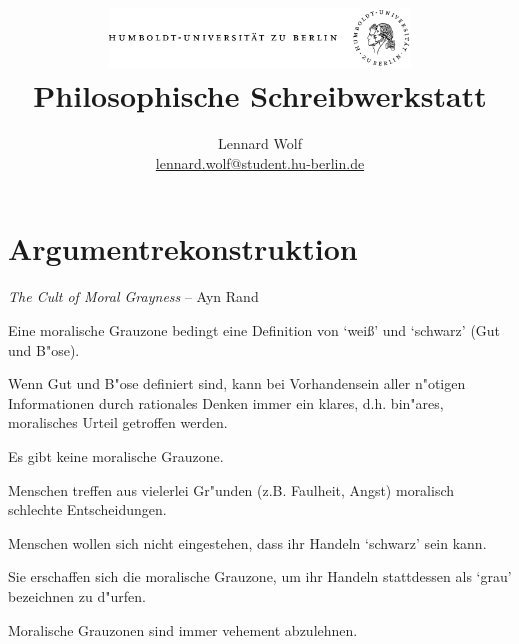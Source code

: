 \documentclass[a4paper]{article}
\begin{document}
\title{
	\includegraphics*[width=0.6\textwidth]{images/hu_logo.png}\\
	\vspace{18pt}
	Philosophische Schreibwerkstatt}
\author{Lennard Wolf\\
        \href{mailto:lennard.wolf@student.hu-berlin.de}{lennard.wolf@student.hu-berlin.de}}
\maketitle


\section*{Argumentrekonstruktion}
\large

\emph{The Cult of Moral Grayness} -- Ayn Rand

\begin{description}[leftmargin=!,labelwidth=\widthof{\bfseries P2}]
  \item[P1] Eine moralische Grauzone bedingt eine Definition von `wei\ss' und `schwarz' (Gut und B"ose).
  \item[P2] Wenn Gut und B"ose definiert sind, kann bei Vorhandensein aller n"otigen Informationen durch rationales Denken immer ein klares, d.h. bin"ares, moralisches Urteil getroffen werden. 
  \item[K1] Es gibt keine moralische Grauzone.
  \item[P3] Menschen treffen aus vielerlei Gr"unden (z.B. Faulheit, Angst) moralisch schlechte Entscheidungen. 
  \item[P4] Menschen wollen sich nicht eingestehen, dass ihr Handeln `schwarz' sein kann.
  \item[K2] Sie erschaffen sich die moralische Grauzone, um ihr Handeln stattdessen als `grau' bezeichnen zu d"urfen.
    \item[K3] Moralische Grauzonen sind immer vehement abzulehnen.
\end{description}
\vspace{9pt}
\end{document}
